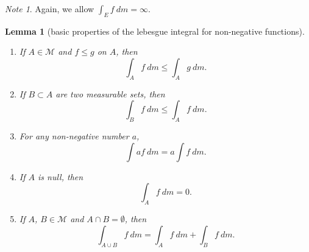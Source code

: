 \documentclass[a4paper,12pt]{scrreprt}
\theoremstyle{definition}
\theoremstyle{plain}
\newtheorem{lemma}[definition]{Lemma}
\theoremstyle{remark}
\newtheorem{note}[definition]{Note}
\begin{document}
\begin{note}
  Again, we allow $\int_{E} f\ dm = \infty$.
\end{note}

\begin{lemma}[basic properties of the lebesgue integral for non-negative functions]
  \label{lemma:basicpropertiesoflebesgueintegralofnonnegativefunction}
  $\,$
  \begin{enumerate}
    \item If $A \in \mathcal{M}$ and $f \leq g$ on $A$, then
      \begin{equation*}
        \int_{A} f\ dm \leq \int_{A} g\ dm.
      \end{equation*}

    \item If $B \subset A$ are two measurable sets, then
      \begin{equation*}
        \int_{B} f\ dm \leq \int_{A} f\ dm.
      \end{equation*}

    \item For any non-negative number $a$,
      \begin{equation*}
        \int af\ dm = a \int f\ dm.
      \end{equation*}

    \item If $A$ is null, then
      \begin{equation*}
        \int_{A} f\ dm = 0.
      \end{equation*}

    \item If $A$, $B \in \mathcal{M}$ and $A \cap B = \emptyset$, then
      \begin{equation*}
        \int_{A \cup B} f\ dm = \int_{A} f\ dm + \int_{B} f\ dm.
      \end{equation*}
  \end{enumerate}
\end{lemma}
\end{document}
